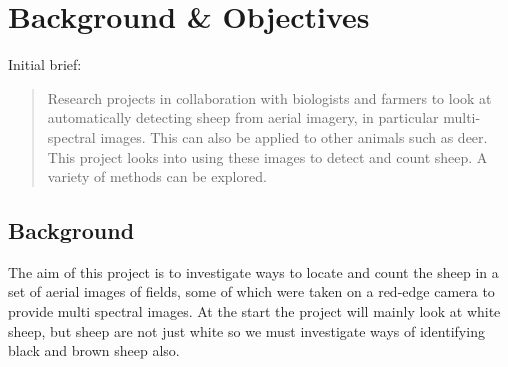 \chapter{Background \& Objectives}
\begin{comment}
    This section should discuss your preparation for the project, including background reading, your analysis of the problem and the process or method you have followed to help structure your work.  It is likely that you will reuse part of your outline project specification, but at the end of the project you should have more to discuss. 

    \textbf{Note}: 

    \begin{itemize}
        \item All of the sections and text in this example are for illustration purposes. The main Chapters are a good starting point, but the content and actual sections that you include are likely to be different.
   
        \item  Look at the document MMP\_S08 Project Report and Technical Work \cite{ProjectReportTechicalWork} for additional guidance.
    \end{itemize}
\end{comment}


Initial brief:

\begin{quote}
Research projects in collaboration with biologists and farmers to look at automatically detecting sheep from aerial imagery, in particular multi-spectral images. This can also be applied to other animals such as deer. This project looks into using these images to detect and count sheep. A variety of methods can be explored. 
\end{quote}


\section{Background}
\begin{comment}
What was your background preparation for the project? What similar systems or research techniques did you assess? What was your motivation and interest in this project? 
\end{comment}
The aim of this project is to investigate ways to locate and count the sheep in a set of aerial images of fields, some of which were taken on a red-edge camera to provide multi spectral images. At the start the project will mainly look at white sheep, but sheep are not just white so we must investigate ways of identifying black and brown sheep also.
    
